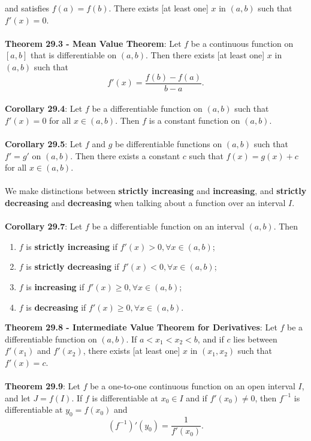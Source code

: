\documentclass{article}
\theoremstyle{definition}
\begin{document}
and satisfies $f(a) = f(b)$. There exists [at least one] $x$ in $(a, b)$ such that $f'(x) = 0$. \\ \\
\textbf{Theorem 29.3 - Mean Value Theorem}: Let $f$ be a continuous function on $[a, b]$ that is differentiable on $(a, b)$. Then there exists [at least one] $x$ in $(a, b)$ such that $$f'(x) = \frac{f(b) - f(a)}{b - a}.$$ \\
\textbf{Corollary 29.4}: Let $f$ be a differentiable function on $(a, b)$ such that $f'(x) = 0$ for all $x \in (a, b)$. Then $f$ is a constant function on $(a, b)$. \\ \\
\textbf{Corollary 29.5}: Let $f$ and $g$ be differentiable functions on $(a, b)$ such that $f' = g'$ on $(a, b)$. Then there exists a constant $c$ such that $f(x) = g(x) + c$ for all $x \in (a, b)$. \\ \\
We make distinctions between \textbf{strictly increasing} and \textbf{increasing}, and \textbf{strictly decreasing} and \textbf{decreasing} when talking about a function over an interval $I$. \\ \\
\textbf{Corollary 29.7}: Let $f$ be a differentiable function on an interval $(a, b)$. Then \begin{enumerate}
    \item $f$ is \textbf{strictly increasing} if $f'(x) > 0, \forall x \in (a, b)$;
    \item $f$ is \textbf{strictly decreasing} if $f'(x) < 0, \forall x \in (a, b)$;
    \item $f$ is \textbf{increasing} if $f'(x) \geq 0, \forall x \in (a, b)$;
    \item $f$ is \textbf{decreasing} if $f'(x) \geq 0, \forall x \in (a, b)$.
\end{enumerate} $ $ \\
\textbf{Theorem 29.8 - Intermediate Value Theorem for Derivatives}: Let $f$ be a differentiable function on $(a, b)$. If $a < x_1 < x_2 < b$, and if $c$ lies between $f'(x_1)$ and $f'(x_2)$, there exists [at least one] $x$ in $(x_1, x_2)$ such that $f'(x) = c$. \\ \\
\textbf{Theorem 29.9}: Let $f$ be a one-to-one continuous function on an open interval $I$, and let $J = f(I)$. If $f$ is differentiable at $x_0 \in I$ and if $f'(x_0) \neq 0$, then $f^{-1}$ is differentiable at $y_0 = f(x_0)$ and $$(f^{-1})'(y_0) = \frac{1}{f'(x_0)}.$$ \\
\end{document}
